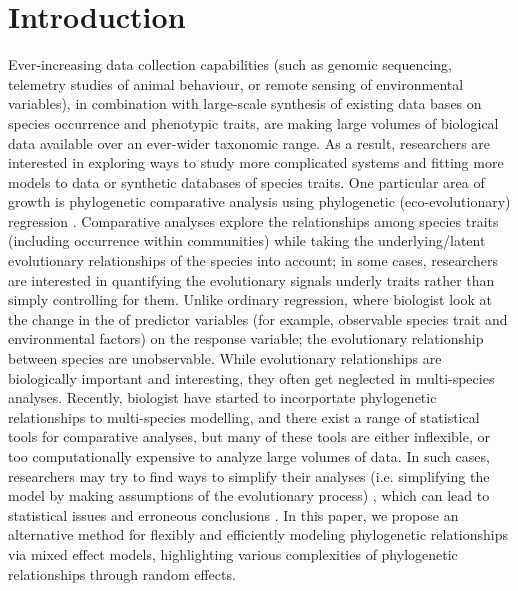 \section{Introduction}

Ever-increasing data collection capabilities (such as genomic sequencing, telemetry studies of animal behaviour, or remote sensing of environmental variables), in combination with large-scale synthesis of existing data bases on species occurrence and phenotypic traits, are making large volumes of biological data available over an ever-wider taxonomic range.
As a result, researchers are interested in exploring ways to study more complicated systems and fitting more models to data or synthetic databases of species traits.
One particular area of growth is phylogenetic comparative analysis using phylogenetic (eco-evolutionary) regression \cite{hansen2012interpreting}. 
Comparative analyses explore the relationships among species traits (including occurrence within communities) while taking the underlying/latent evolutionary relationships of the species into account; in some cases, researchers are interested in quantifying the evolutionary signals underly traits rather than simply controlling for them.
Unlike ordinary regression, where biologist look at the change in the of predictor variables (for example, observable species trait and environmental factors) on the response variable; the evolutionary relationship between species are unobservable. 
While evolutionary relationships are biologically important and interesting, they often get neglected in multi-species analyses. 
Recently, biologist have started to incorportate phylogenetic relationships to multi-species modelling, and there exist a range of statistical tools for comparative analyses, but many of these tools are either inflexible, or too computationally expensive to analyze large volumes of data.
In such cases, researchers may try to find ways to simplify their analyses (i.e. simplifying the model by making assumptions of the evolutionary process) \citep{bunnefeld2012island, ord2010adaptation},
which can lead to statistical issues and erroneous conclusions
\cite{felsenstein1985phylogenies, li2017statistical}.
In this paper, we propose an alternative method for flexibly and efficiently modeling phylogenetic relationships via mixed effect models, highlighting various complexities of phylogenetic relationships through random effects.

